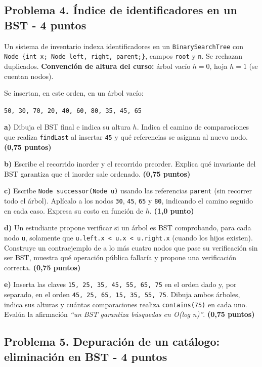 \documentclass[11pt,a4paper]{article}
\newcommand{\pts}[1]{\textbf{(#1)}}
\begin{document}
\subsection*{Problema 4. Índice de identificadores en un BST - 4 puntos}

Un sistema de inventario indexa identificadores en un \texttt{BinarySearchTree} con \texttt{Node \{int x; Node left, right, parent;\}}, campos \texttt{root} y \texttt{n}. Se rechazan duplicados. \textbf{Convención de altura del curso:} árbol vacío $h = 0$, hoja $h = 1$ (se cuentan nodos).

Se insertan, en este orden, en un árbol vacío:
\begin{center}
\texttt{50, 30, 70, 20, 40, 60, 80, 35, 45, 65}
\end{center}

\textbf{a)} Dibuja el BST final e indica su altura $h$. Indica el camino de comparaciones que realiza \texttt{findLast} al insertar \texttt{45} y qué referencias se asignan al nuevo nodo. \pts{0,75 puntos}

\textbf{b)} Escribe el recorrido inorder y el recorrido preorder. Explica qué invariante del BST garantiza que el inorder sale ordenado. \pts{0,75 puntos}

\textbf{c)} Escribe \texttt{Node successor(Node u)} usando las referencias \texttt{parent} (sin recorrer todo el árbol). Aplícalo a los nodos \texttt{30}, \texttt{45}, \texttt{65} y \texttt{80}, indicando el camino seguido en cada caso. Expresa su costo en función de $h$. \pts{1,0 punto}

\textbf{d)} Un estudiante propone verificar si un árbol es BST comprobando, para cada nodo \texttt{u}, solamente que \texttt{u.left.x < u.x < u.right.x} (cuando los hijos existen). Construye un contraejemplo de a lo más cuatro nodos que pase su verificación sin ser BST, muestra qué operación pública fallaría y propone una verificación correcta. \pts{0,75 puntos}

\textbf{e)} Inserta las claves \texttt{15, 25, 35, 45, 55, 65, 75} en el orden dado y, por separado, en el orden \texttt{45, 25, 65, 15, 35, 55, 75}. Dibuja ambos árboles, indica sus alturas y cuántas comparaciones realiza \texttt{contains(75)} en cada uno. Evalúa la afirmación \emph{``un BST garantiza búsquedas en O(log n)''}. \pts{0,75 puntos}

\newpage
\subsection*{Problema 5. Depuración de un catálogo: eliminación en BST - 4 puntos}
\end{document}
